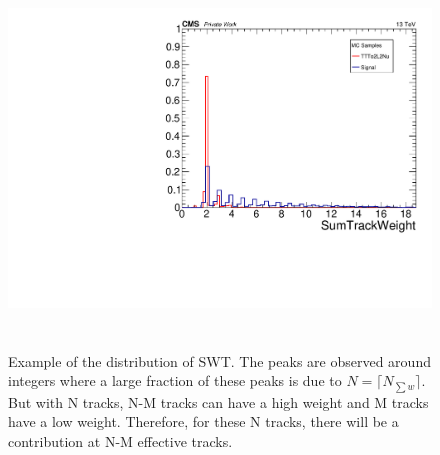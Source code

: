 \documentclass{cernatlasnote}
\begin{document}
\begin{appendices}
\begin{figure}[ht]
\centering
\includegraphics[height=10cm, width=14cm, trim= 0cm 0cm 0cm 0cm,clip]{images/VTXEff/SumTrackWeightCompare.pdf}
\caption{\label{fig:nMTW} Example of the distribution of SWT. The peaks are observed around integers where a large fraction of these peaks is due to $ N = \lceil N_{\sum w}\rceil$. But with N tracks, N-M tracks can have a high weight and M tracks have a low weight. Therefore,  for these N tracks, there will be a contribution at N-M effective tracks.}
\end{figure} 


\end{appendices}
\end{document}
